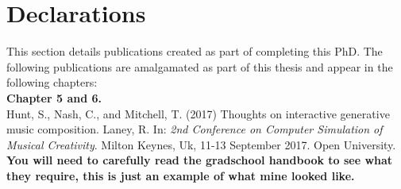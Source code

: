

\section*{Declarations}

This section details publications created as part of completing this PhD. The following publications are amalgamated as part of this thesis and appear in the following chapters:\\%

\textbf{Chapter 5 and 6.}\\
Hunt, S., Nash, C., and Mitchell, T. (2017) Thoughts on interactive generative music composition. Laney, R. In: \textit{2nd Conference on Computer Simulation of Musical Creativity}. Milton Keynes, Uk, 11-13 September 2017. Open University.\\ 


\textbf{You will need to carefully read the gradschool handbook to see what they require, this is just an example of what mine looked like.}








\newpage